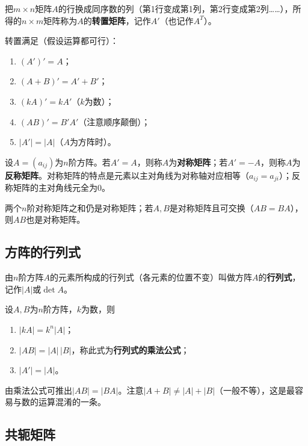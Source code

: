 \begin{definition}
把$m\times n$矩阵$A$的行换成同序数的列（第1行变成第1列，第2行变成第2列……），所得的$n\times m$矩阵称为$A$的\textbf{转置矩阵}，记作$A'$（也记作$A^{T}$）。
\end{definition}

转置满足（假设运算都可行）：
\begin{enumerate}
\item $(A')'=A$；
\item $(A+B)'=A'+B'$；
\item $(kA)'=kA'$（$k$为数）；
\item $(AB)'=B'A'$（注意顺序颠倒）；
\item $|A'|=|A|$（$A$为方阵时）。
\end{enumerate}

设$A=(a_{ij})$为$n$阶方阵。若$A'=A$，则称$A$为\textbf{对称矩阵}；若$A'=-A$，则称$A$为\textbf{反称矩阵}。对称矩阵的特点是元素以主对角线为对称轴对应相等（$a_{ij}=a_{ji}$）；反称矩阵的主对角线元全为$0$。

两个$n$阶对称矩阵之和仍是对称矩阵；若$A,B$是对称矩阵且可交换（$AB=BA$），则$AB$也是对称矩阵。

\subsection{方阵的行列式}

\begin{definition}
由$n$阶方阵$A$的元素所构成的行列式（各元素的位置不变）叫做方阵$A$的\textbf{行列式}，记作$|A|$或$\det A$。
\end{definition}

\begin{theorem}
设$A,B$为$n$阶方阵，$k$为数，则
\begin{enumerate}
\item $|kA|=k^n|A|$；
\item $|AB|=|A|\,|B|$，称此式为\textbf{行列式的乘法公式}；
\item $|A'|=|A|$。
\end{enumerate}
\end{theorem}


由乘法公式可推出$|AB|=|BA|$。注意$|A+B|\neq|A|+|B|$（一般不等），这是最容易与数的运算混淆的一条。

\subsection{共轭矩阵}

